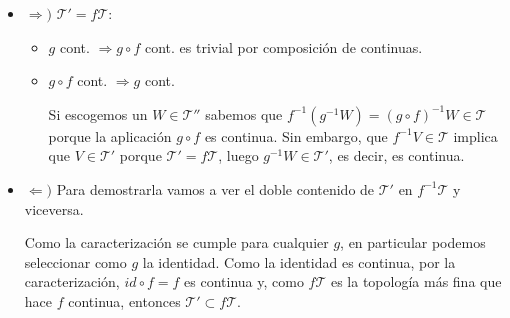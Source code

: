 \begin{demo}
\begin{itemize}
    \item $\Rightarrow)$ $\mathcal{T}' = f\mathcal{T}: $ 
    \begin{itemize}
        \item $g$ cont. $\Rightarrow g \circ f$ cont. es trivial por composición de continuas.
        \item $g \circ f$ cont. $\Rightarrow g$ cont.
        
        Si escogemos un $W \in \mathcal{T}''$ sabemos que $f^{-1}\left( g^{-1} W \right) = \left( g \circ f \right)^{-1} W \in \mathcal{T}$ porque la aplicación $g\circ f$ es continua. Sin embargo, que $f^{-1} V \in \mathcal{T}$ implica que $V\in \mathcal{T}'$ porque $\mathcal{T}' = f\mathcal{T}$, luego $g^{-1}W \in \mathcal{T}'$, es decir, es continua.
    \end{itemize}

    \item $\Leftarrow)$
    Para demostrarla vamos a ver el doble contenido de $\mathcal{T}'$ en $f^{-1}\mathcal{T} $ y viceversa.
    
    Como la caracterización se cumple para cualquier $g$, en particular podemos seleccionar como $g$ la identidad. Como la identidad es continua, por la caracterización, $id \circ f = f$ es continua y, como $f\mathcal{T}$ es la topología más fina que hace $f$ continua, entonces $\mathcal{T}'\subset f\mathcal{T}$.

    \begin{figure}[H]
        \centering    
    \end{figure}
    

\end{itemize}
\end{demo}
